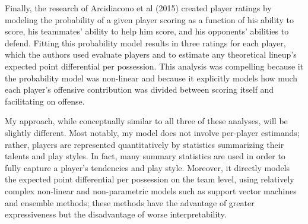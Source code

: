 Finally, the research of Arcidiacono et al (2015) created player ratings by modeling
the probability of a given player scoring as a function of his ability to score, his
teammates' ability to help him score, and his opponents' abilities to defend.
Fitting this probability model results in three ratings for each player, which the
authors used evaluate players and to estimate any theoretical lineup's expected
point differential per possession. This analysis was compelling because it the
probability model was non-linear and because it explicitly models how much each
player's offensive contribution was divided between scoring itself and facilitating
on offense.

My approach, while conceptually similar to all three of these analyses, will be
slightly different. Most notably, my model does not involve per-player estimands;
rather, players are represented quantitatively by statistics summarizing their
talents and play styles. In fact, many summary statistics are used in order to fully
capture a player's tendencies and play style. Moreover, it directly models the
expected point differential per possession on the team level, using relatively
complex non-linear and non-parametric models such as support vector machines and
ensemble methods; these methods have the advantage of greater expressiveness but the
disadvantage of worse interpretability.
